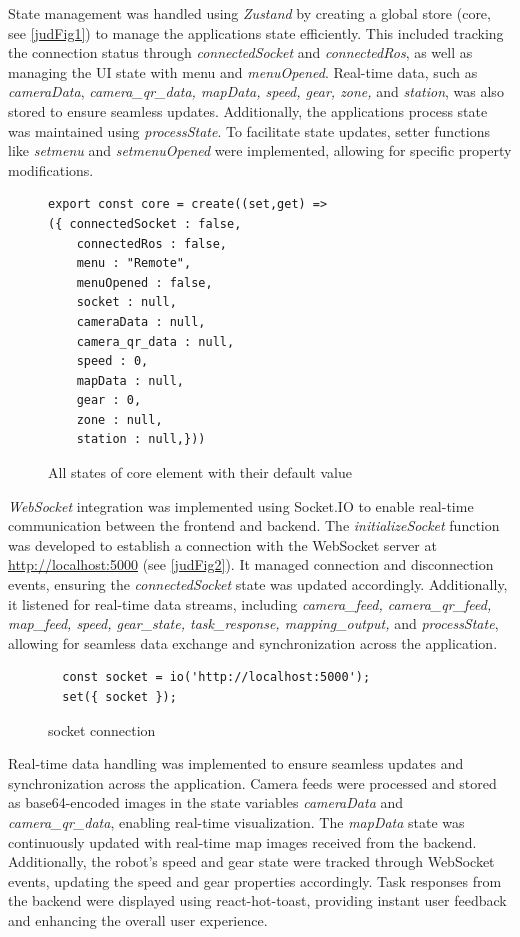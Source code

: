 \documentclass[a4paper,12pt]{extreport}
\begin{document}
State management was handled using \emph{Zustand} by creating a global
store (core, see \cref{judFig1}) to manage the application\textquotesingle s
state efficiently. This included tracking the connection status through
\emph{connectedSocket} and \emph{connectedRos}, as well as managing the
UI state with menu and \emph{menuOpened}. Real-time data, such as
\emph{cameraData}, \emph{camera\_qr\_data, mapData, speed, gear, zone,}
and \emph{station}, was also stored to ensure seamless updates.
Additionally, the application\textquotesingle s process state was
maintained using \emph{processState}. To facilitate state updates,
setter functions like \emph{setmenu} and \emph{setmenuOpened} were
implemented, allowing for specific property modifications.
\begin{figure}[h!]
\begin{verbatim}
export const core = create((set,get) => 
({ connectedSocket : false,
    connectedRos : false,
    menu : "Remote",
    menuOpened : false,
    socket : null,
    cameraData : null,
    camera_qr_data : null,
    speed : 0,
    mapData : null,
    gear : 0,
    zone : null,
    station : null,}))

\end{verbatim}
\caption{All states of core element with their default value}
\end{figure}
\emph{WebSocket} integration was implemented using Socket.IO to enable
real-time communication between the frontend and backend. The
\emph{initializeSocket} function was developed to establish a connection
with the WebSocket server at \url{http://localhost:5000} (see \cref{judFig2}).
It managed connection and disconnection events, ensuring the
\emph{connectedSocket} state was updated accordingly. Additionally, it
listened for real-time data streams, including \emph{camera\_feed,
camera\_qr\_feed, map\_feed, speed, gear\_state, task\_response,
mapping\_output,} and \emph{processState}, allowing for seamless data
exchange and synchronization across the application.
\begin{figure}[h!]
  \begin{verbatim}
  const socket = io('http://localhost:5000');
  set({ socket });
\end{verbatim}
\caption{socket connection}
\end{figure}


Real-time data handling was implemented to ensure seamless updates and
synchronization across the application. Camera feeds were processed and
stored as base64-encoded images in the state variables \emph{cameraData}
and \emph{camera\_qr\_data}, enabling real-time visualization. The
\emph{mapData} state was continuously updated with real-time map images
received from the backend. Additionally, the robot's speed and gear
state were tracked through WebSocket events, updating the speed and gear
properties accordingly. Task responses from the backend were displayed
using react-hot-toast, providing instant user feedback and enhancing the
overall user experience.
\end{document}
